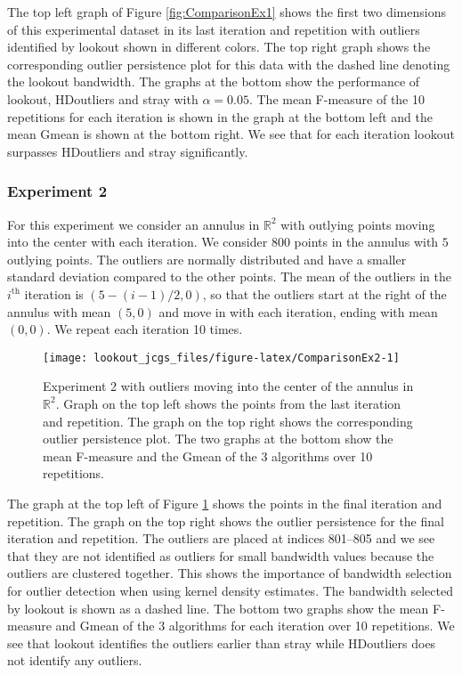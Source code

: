 \documentclass[12pt]{article}
\theoremstyle{definition}
\theoremstyle{definition}
\theoremstyle{definition}
\theoremstyle{remark}
\begin{document}
The top left graph of Figure \ref{fig:ComparisonEx1} shows the first two dimensions of this experimental dataset in its last iteration and repetition with outliers identified by lookout shown in different colors. The top right graph shows the corresponding outlier persistence plot for this data with the dashed line denoting the lookout bandwidth. The graphs at the bottom show the performance of lookout, HDoutliers and stray with \(\alpha = 0.05\). The mean F-measure of the 10 repetitions for each iteration is shown in the graph at the bottom left and the mean Gmean is shown at the bottom right. We see that for each iteration lookout surpasses HDoutliers and stray significantly.

\hypertarget{experiment-2}{%
\subsubsection*{Experiment 2}\label{experiment-2}}

For this experiment we consider an annulus in \(\mathbb{R}^2\) with outlying points moving into the center with each iteration. We consider \(800\) points in the annulus with \(5\) outlying points. The outliers are normally distributed and have a smaller standard deviation compared to the other points. The mean of the outliers in the \(i^{\text{th}}\) iteration is \(\left( 5 - (i-1) /2, 0 \right)\), so that the outliers start at the right of the annulus with mean \((5,0)\) and move in with each iteration, ending with mean \((0,0)\). We repeat each iteration 10 times.

\begin{figure}
\texttt{[image: lookout\_jcgs\_files/figure-latex/ComparisonEx2-1]} \caption{Experiment 2 with outliers moving into the center of the annulus in $\mathbb{R}^2$. Graph on the top left shows the points from the last iteration and repetition. The graph on the top right shows the corresponding outlier persistence plot. The two graphs at the bottom show the mean F-measure and the Gmean of the 3 algorithms over 10 repetitions.}\label{fig:ComparisonEx2}
\end{figure}

The graph at the top left of Figure \ref{fig:ComparisonEx2} shows the points in the final iteration and repetition. The graph on the top right shows the outlier persistence for the final iteration and repetition. The outliers are placed at indices 801--805 and we see that they are not identified as outliers for small bandwidth values because the outliers are clustered together. This shows the importance of bandwidth selection for outlier detection when using kernel density estimates. The bandwidth selected by lookout is shown as a dashed line. The bottom two graphs show the mean F-measure and Gmean of the 3 algorithms for each iteration over 10 repetitions. We see that lookout identifies the outliers earlier than stray while HDoutliers does not identify any outliers.
\end{document}
